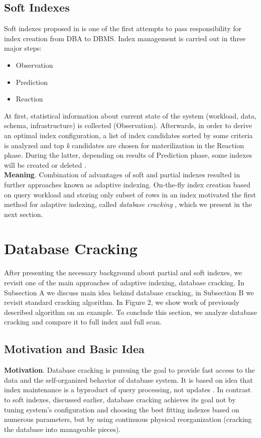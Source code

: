 \documentclass[10pt, conference, compsocconf]{IEEEtran}
\begin{document}
\subsection{Soft Indexes}
Soft indexes proposed in \cite{soft_indexes} is one of the first attempts to pass responsibility for index creation from DBA to DBMS. Index management is carried out in three major steps:
\begin{itemize}
\item{Observation}
\item{Prediction}
\item{Reaction}
\end{itemize}

At first, statistical information about current state of the system (workload, data, schema, infrastructure) is collected (Observation). Afterwards, in order to derive an optimal index configuration, a list of index candidates sorted by some criteria is analyzed and top \textit{k} candidates are chosen for materilization in the Reaction phase. During the latter, depending on results of Prediction phase, some indexes will be created or deleted \cite{soft_indexes}.\\

\textbf{Meaning}. Combination of advantages of soft and partial indexes resulted in further approaches known as adaptive indexing. On-the-fly index creation based on query workload and storing only subset of rows in an index motivated the first method for adaptive indexing, called \textit{database cracking} \cite{cracking}, which we present in the next section.

\section{Database Cracking}
After presenting the necessary background about partial and soft indexes, we revisit one of the main approaches of adaptive indexing, database cracking. In Subsection A we discuss main idea behind database cracking, in Subsection B we revisit standard cracking algorithm. In Figure 2, we show work of previously described algorithm on an example. To conclude this section, we analyze database cracking and compare it to full index and full scan.

\subsection{Motivation and Basic Idea}
\textbf{Motivation}. Database cracking is pursuing the goal to provide fast access to the data and the self-organized behavior of database system. It is based on idea that index maintenance is a byproduct of query processing, not updates \cite{cracking}. In contrast to soft indexes, discussed earlier, database cracking achieves its goal not by tuning system's configuration and choosing the best fitting indexes based on numerous parameters, but by using continuous physical reorganization (cracking the database into manageable pieces).
\end{document}
